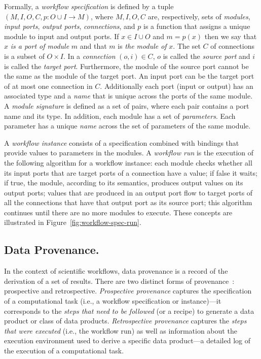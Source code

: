 \documentclass[12pt]{iopart}
\newcommand{\ie}{i.e.,\xspace}
\begin{document}
Formally, a \emph{workflow specification} is defined by a tuple
$(M,I,O,C,p:O \cup I \rightarrow M)$, where $M, I, O, C$ are,
respectively, sets of {\it modules}, {\it input ports}, {\it output
  ports}, {\it connections}, and $p$ is a function that assigns a
unique module to input and output ports.  If $x \in I \cup O$ and $m =
p(x)$ then we say that $x$ {\it is a port of module} $m$ and that $m$
is {\it the module of} $x$.  The set $C$ of connections is a subset of
$O \times I$.  In a {\it connection} $(o,i) \in C$, $o$ is called the
{\it source port} and $i$ is called the {\it target
  port}. Furthermore, the module of the source port cannot be the same
as the module of the target port.  An input port can be the target
port of at most one connection in $C$.  Additionally each port (input
or output) has an associated type and a {\it name} that is unique
across the ports of the same module.  A {\it module signature} is
defined as a set of pairs, where each pair contains a port name and
its type.  In addition, each module has a set of {\it parameters}.  Each parameter
has a unique {\it name} across the set of parameters of the same
module.

A \emph{workflow instance} consists of a specification combined with
bindings that provide values to parameters in the modules.  A {\it
  workflow run} is the execution of the following algorithm for a
workflow instance: each module checks whether all its input ports that
are target ports of a connection have a value; if false it waits; if
true, the module, according to its semantics, produces output values
on its output ports; values that are produced in an output port flow
to target ports of all the connections that have that output port as
its source port; this algorithm continues until there are no more
modules to execute.
%
These concepts are illustrated in Figure~\ref{fig:workflow-spec-run}.

\subsection{Data Provenance.}
In the context of scientific workflows, data provenance is a record of
the derivation of a set of results.  There are two distinct forms of
provenance~\cite{VDL:Challenge06}: prospective and retrospective.
\emph{Prospective provenance} captures the specification of a
computational task (\ie a workflow specification or instance)---it
corresponds to the \emph{steps that need to be followed} (or a recipe)
to generate a data product or class of data products.
\emph{Retrospective provenance} captures the \emph{steps that were
  executed} (\ie the workflow run) as well as information about the
execution environment used to derive a specific data product---a
detailed log of the execution of a computational task.
\end{document}
